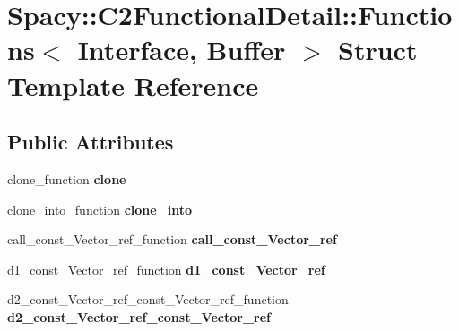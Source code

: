 \hypertarget{structSpacy_1_1C2FunctionalDetail_1_1Functions}{\section{\-Spacy\-:\-:\-C2\-Functional\-Detail\-:\-:\-Functions$<$ \-Interface, \-Buffer $>$ \-Struct \-Template \-Reference}
\label{structSpacy_1_1C2FunctionalDetail_1_1Functions}
}
\subsection*{\-Public \-Attributes}
\begin{DoxyCompactItemize}
\item 
\hypertarget{structSpacy_1_1C2FunctionalDetail_1_1Functions_a9b9f947ccca89dd5fc25ec26a2332348}{clone\-\_\-function {\bfseries clone}}\label{structSpacy_1_1C2FunctionalDetail_1_1Functions_a9b9f947ccca89dd5fc25ec26a2332348}

\item 
\hypertarget{structSpacy_1_1C2FunctionalDetail_1_1Functions_a51057550ec1fd7f5decec8d74d1b3909}{clone\-\_\-into\-\_\-function {\bfseries clone\-\_\-into}}\label{structSpacy_1_1C2FunctionalDetail_1_1Functions_a51057550ec1fd7f5decec8d74d1b3909}

\item 
\hypertarget{structSpacy_1_1C2FunctionalDetail_1_1Functions_a250b054a910546fd65d715ad43ce7920}{call\-\_\-const\-\_\-\-Vector\-\_\-ref\-\_\-function {\bfseries call\-\_\-const\-\_\-\-Vector\-\_\-ref}}\label{structSpacy_1_1C2FunctionalDetail_1_1Functions_a250b054a910546fd65d715ad43ce7920}

\item 
\hypertarget{structSpacy_1_1C2FunctionalDetail_1_1Functions_a2a0ccf79e758e4320c340153f577bf73}{d1\-\_\-const\-\_\-\-Vector\-\_\-ref\-\_\-function {\bfseries d1\-\_\-const\-\_\-\-Vector\-\_\-ref}}\label{structSpacy_1_1C2FunctionalDetail_1_1Functions_a2a0ccf79e758e4320c340153f577bf73}

\item 
\hypertarget{structSpacy_1_1C2FunctionalDetail_1_1Functions_a067efbeca784f3273c88f25a2d78aca4}{d2\-\_\-const\-\_\-\-Vector\-\_\-ref\-\_\-const\-\_\-\-Vector\-\_\-ref\-\_\-function {\bfseries d2\-\_\-const\-\_\-\-Vector\-\_\-ref\-\_\-const\-\_\-\-Vector\-\_\-ref}}\label{structSpacy_1_1C2FunctionalDetail_1_1Functions_a067efbeca784f3273c88f25a2d78aca4}


\end{DoxyCompactItemize}
